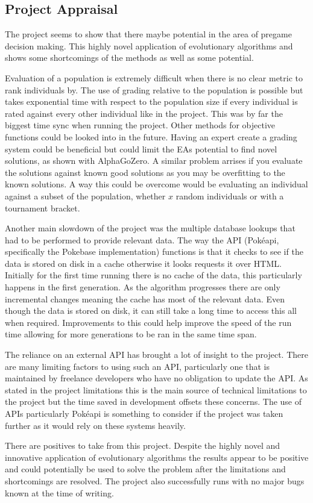 \documentclass[a4paper]{article}
\newcommand{\Pokeapi}{Pok\'{e}api}
\begin{document}
\subsection{Project Appraisal}
\par
The project seems to show that there maybe potential in the area of pregame decision making.
This highly novel application of evolutionary algorithms and shows some shortcomings of the methods as well as some potential.
\par
Evaluation of a population is extremely difficult when there is no clear metric to rank individuals by.
The use of grading relative to the population is possible but takes exponential time with respect to the population size if every individual is rated against every other individual like in the project.
This was by far the biggest time sync when running the project.
Other methods for objective functions could be looked into in the future.
Having an expert create a grading system could be beneficial but could limit the EAs potential to find novel solutions, as shown with AlphaGoZero.
A similar problem arrises if you evaluate the solutions against known good solutions as you may be overfitting to the known solutions.
A way this could be overcome would be evaluating an individual against a subset of the population, whether $x$ random individuals or with a tournament bracket.
\par
Another main slowdown of the project was the multiple database lookups that had to be performed to provide relevant data.
The way the API (\Pokeapi{}, specifically the Pokebase implementation) functions is that it checks to see if the data is stored on disk in a cache otherwise it looks requests it over HTML\@.
Initially for the first time running there is no cache of the data, this particularly happens in the first generation.
As the algorithm progresses there are only incremental changes meaning the cache has most of the relevant data.
Even though the data is stored on disk, it can still take a long time to access this all when required.
Improvements to this could help improve the speed of the run time allowing for more generations to be ran in the same time span.
\par
The reliance on an external API has brought a lot of insight to the project.
There are many limiting factors to using such an API, particularly one that is maintained by freelance developers who have no obligation to update the API\@.
As stated in the project limitations this is the main source of technical limitations to the project but the time saved in development offsets these concerns.
The use of APIs particularly \Pokeapi{} is something to consider if the project was taken further as it would rely on these systems heavily.
\\ \par
There are positives to take from this project.
Despite the highly novel and innovative application of evolutionary algorithms the results appear to be positive and could potentially be used to solve the problem after the limitations and shortcomings are resolved.
The project also successfully runs with no major bugs known at the time of writing.
\end{document}
